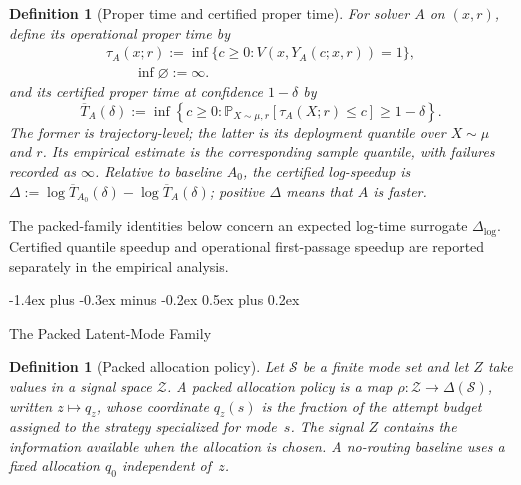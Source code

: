 \documentclass[10pt,twocolumn]{article}
\makeatletter
\theoremstyle{paperplain}
\theoremstyle{paperdefinition}
\newtheorem{definition}[theorem]{Definition}
\theoremstyle{paperremark}
\renewcommand{\subsection}{%
  \@startsection{subsection}{2}{\z@}%
    {-1.4ex plus -0.3ex minus -0.2ex}%
    {0.5ex plus 0.2ex}%
    {\normalfont\normalsize\bfseries\raggedright}}
\newcommand{\Prb}{\mathbb{P}}
\newcommand{\cS}{\mathcal{S}}
\newcommand{\Dlog}{\Delta_{\log}}
\makeatother
\begin{document}
\begin{definition}[Proper time and certified proper time]
\label{def:proper-time}
For solver $A$ on $(x,r)$, define its \emph{operational proper time} by
\[
\begin{gathered}
\tau_A(x;r):=
\inf\{c\ge 0:V(x,Y_A(c;x,r))=1\},\\
\qquad \inf\varnothing:=\infty.
\end{gathered}
\]
\label{def:certified-time}
and its \emph{certified proper time} at confidence $1-\delta$ by
\[
\overline{T}_A(\delta)
:=
\inf\!\left\{c\ge 0:
\Prb_{X\sim\mu,r}[\tau_A(X;r)\le c]\ge 1-\delta
\right\}.
\]
The former is trajectory-level; the latter is its deployment quantile over
$X\sim\mu$ and $r$.  Its empirical estimate is the corresponding sample
quantile, with failures recorded as $\infty$.
\label{def:speedup}
Relative to baseline $A_0$, the \emph{certified log-speedup} is
$\Delta:=\log\overline T_{A_0}(\delta)-\log\overline T_A(\delta)$; positive
$\Delta$ means that $A$ is faster.
\end{definition}

The packed-family identities below concern an expected log-time surrogate
$\Dlog$.  Certified quantile speedup and operational first-passage speedup are
reported separately in the empirical analysis.

\subsection{The Packed Latent-Mode Family}
\label{subsec:packed-family-def}

\begin{definition}[Packed allocation policy]
\label{def:routing-policy}
Let $\cS$ be a finite mode set and let $Z$ take values in a signal space
$\mathcal Z$.  A \emph{packed allocation policy} is a map
$\rho:\mathcal Z\to\Delta(\cS)$, written $z\mapsto q_z$, whose coordinate
$q_z(s)$ is the fraction of the attempt budget assigned to the strategy
specialized for mode~$s$.  The signal $Z$ contains the information available
when the allocation is chosen.  A no-routing baseline uses a fixed allocation
$q_0$ independent of~$z$.
\end{definition}
\end{document}
